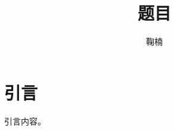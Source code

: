 \documentclass[Doctor]{BJTU-Thesis}
\author{鞠楠}
\title{题目}
\begin{document}
	\makeAuthorization
	\makeInfo
	
	
	
	\tableofcontents\newpage
	\chapter{引言}
	引言内容。
\end{document}
